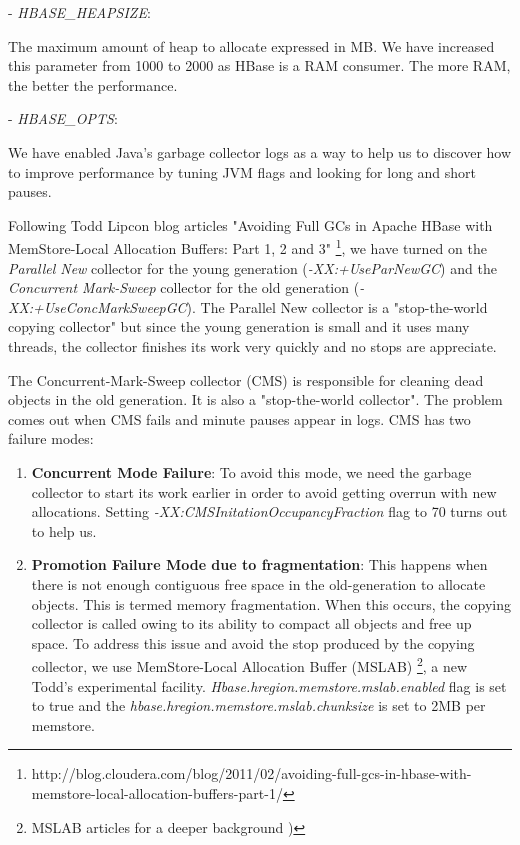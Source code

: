 \begin{enumerate}
- \textit{HBASE\_HEAPSIZE}: 
\par
The maximum amount of heap to allocate expressed in MB. We have increased this parameter from 1000 to 2000 as HBase is a RAM consumer. The more RAM, the better the performance.
\par
- \textit{HBASE\_OPTS}:
\par
We have enabled Java's garbage collector logs as a way to help us to discover how to improve performance by tuning JVM flags and looking for long and short pauses. 
\par
Following Todd Lipcon blog articles "Avoiding Full GCs in Apache HBase with MemStore-Local Allocation Buffers: Part 1, 2 and 3" \footnote{http://blog.cloudera.com/blog/2011/02/avoiding-full-gcs-in-hbase-with-memstore-local-allocation-buffers-part-1/}, we have turned on the \textit{Parallel New} collector for the young generation (\textit{-XX:+UseParNewGC}) and the \textit{Concurrent Mark-Sweep} collector for the old generation (\textit{-XX:+UseConcMarkSweepGC}). The Parallel New collector is a "stop-the-world copying collector" but since the young generation is small and it uses many threads, the collector finishes its work very quickly and no stops are appreciate.
\par
The Concurrent-Mark-Sweep collector (CMS) is responsible for cleaning dead objects in the old generation. It is also a "stop-the-world collector". The problem comes out when CMS fails and minute pauses appear in logs. CMS has two failure modes:
\begin{enumerate}
\item \textbf{Concurrent Mode Failure}: To avoid this mode, we need the garbage collector to start its work earlier in order to avoid getting overrun with new allocations. Setting \textit{-XX:CMSInitationOccupancyFraction} flag to 70 turns out to help us.
\item \textbf{Promotion Failure Mode due to fragmentation}: This happens when there is not enough contiguous free space in the old-generation to allocate objects. This is termed memory fragmentation. When this occurs, the copying collector is called owing to its ability to compact all objects and free up space. To address this issue and avoid the stop produced by the copying collector, we use MemStore-Local Allocation Buffer (MSLAB) \footnote{MSLAB articles for a deeper background \cite{ApacheHBaseMSLAB} \cite{MSLAB})}, a new Todd's experimental facility.  \textit{Hbase.hregion.memstore.mslab.enabled} flag is set to true and the \textit{hbase.hregion.memstore.mslab.chunksize} is set to 2MB per memstore.


\end{enumerate}
\end{enumerate}
